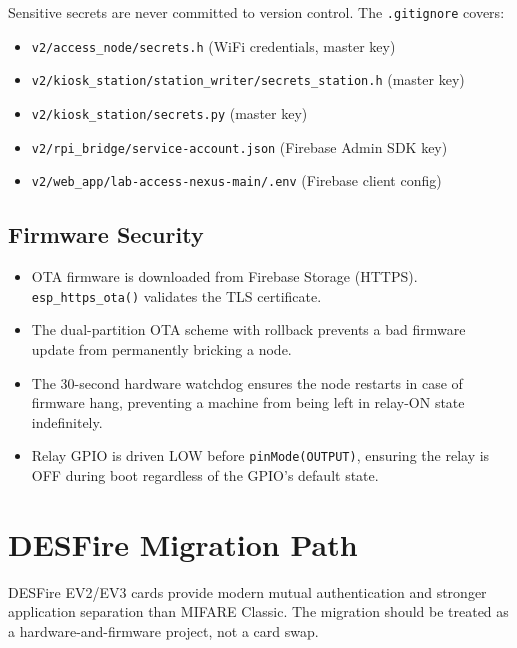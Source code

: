 Sensitive secrets are never committed to version control. The \texttt{.gitignore} covers:
\begin{itemize}[leftmargin=1.5em,noitemsep]
    \item \texttt{v2/access\_node/secrets.h} (WiFi credentials, master key)
    \item \texttt{v2/kiosk\_station/station\_writer/secrets\_station.h} (master key)
    \item \texttt{v2/kiosk\_station/secrets.py} (master key)
    \item \texttt{v2/rpi\_bridge/service-account.json} (Firebase Admin SDK key)
    \item \texttt{v2/web\_app/lab-access-nexus-main/.env} (Firebase client config)
\end{itemize}

\subsection{Firmware Security}

\begin{itemize}[leftmargin=1.5em]
    \item OTA firmware is downloaded from Firebase Storage (HTTPS). \texttt{esp\_https\_ota()} validates the TLS certificate.
    \item The dual-partition OTA scheme with rollback prevents a bad firmware update from permanently bricking a node.
    \item The 30-second hardware watchdog ensures the node restarts in case of firmware hang, preventing a machine from being left in relay-ON state indefinitely.
    \item Relay GPIO is driven LOW before \texttt{pinMode(OUTPUT)}, ensuring the relay is OFF during boot regardless of the GPIO's default state.
\end{itemize}

\section{DESFire Migration Path}

DESFire EV2/EV3 cards provide modern mutual authentication and stronger application separation than MIFARE Classic. The migration should be treated as a hardware-and-firmware project, not a card swap.

